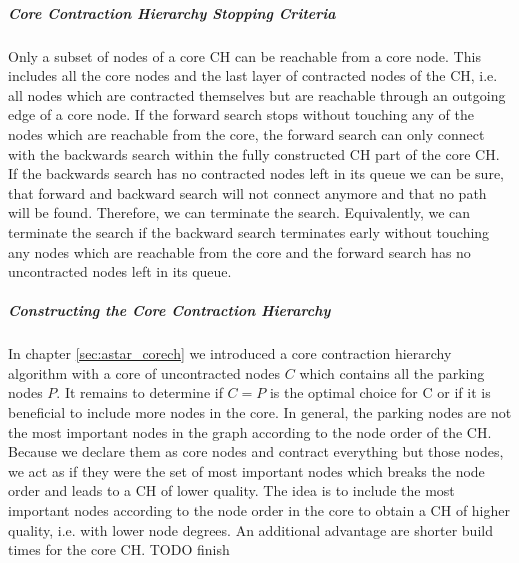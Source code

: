 \subparagraph{Core Contraction Hierarchy Stopping Criteria}
Only a subset of nodes of a core CH can be reachable from a core node. This includes all the core nodes and the last layer of contracted nodes of the CH, i.e. all nodes which are contracted themselves but are reachable through an outgoing edge of a core node. If the forward search stops without touching any of the nodes which are reachable from the core, the forward search can only connect with the backwards search within the fully constructed CH part of the core CH. If the backwards search has no contracted nodes left in its queue we can be sure, that forward and backward search will not connect anymore and that no path will be found. Therefore, we can terminate the search. Equivalently, we can terminate the search if the backward search terminates early without touching any nodes which are reachable from the core and the forward search has no uncontracted nodes left in its queue.

\subparagraph{Constructing the Core Contraction Hierarchy}
In chapter \ref{sec:astar_corech} we introduced a core contraction hierarchy algorithm with a core of uncontracted nodes $C$ which contains all the parking nodes $P$. It remains to determine if $C=P$ is the optimal choice for C or if it is beneficial to include more nodes in the core. In general, the parking nodes are not the most important nodes in the graph according to the node order of the CH. Because we declare them as core nodes and contract everything but those nodes, we act as if they were the set of most important nodes which breaks the node order and leads to a CH of lower quality. The idea is to include the most important nodes according to the node order in the core to obtain a CH of higher quality, i.e. with lower node degrees. An additional advantage are shorter build times for the core CH. TODO finish
